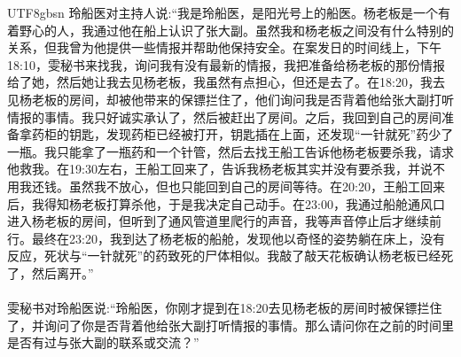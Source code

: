 \documentclass[11pt]{article}
\begin{document}
{\begin{CJK}{UTF8}{gbsn}
玲船医对主持人说:``我是玲船医，是阳光号上的船医。杨老板是一个有着野心的人，我通过他在船上认识了张大副。虽然我和杨老板之间没有什么特别的关系，但我曾为他提供一些情报并帮助他保持安全。在案发日的时间线上，下午18:10，雯秘书来找我，询问我有没有最新的情报，我把准备给杨老板的那份情报给了她，然后她让我去见杨老板，我虽然有点担心，但还是去了。在18:20，我去见杨老板的房间，却被他带来的保镖拦住了，他们询问我是否背着他给张大副打听情报的事情。我只好诚实承认了，然后被赶出了房间。之后，我回到自己的房间准备拿药柜的钥匙，发现药柜已经被打开，钥匙插在上面，还发现“一针就死”药少了一瓶。我只能拿了一瓶药和一个针管，然后去找王船工告诉他杨老板要杀我，请求他救我。在19:30左右，王船工回来了，告诉我杨老板其实并没有要杀我，并说不用我还钱。虽然我不放心，但也只能回到自己的房间等待。在20:20，王船工回来后，我得知杨老板打算杀他，于是我决定自己动手。在23:00，我通过船舱通风口进入杨老板的房间，但听到了通风管道里爬行的声音，我等声音停止后才继续前行。最终在23:20，我到达了杨老板的船舱，发现他以奇怪的姿势躺在床上，没有反应，死状与“一针就死”的药致死的尸体相似。我敲了敲天花板确认杨老板已经死了，然后离开。''\\ \\
雯秘书对玲船医说:``玲船医，你刚才提到在18:20去见杨老板的房间时被保镖拦住了，并询问了你是否背着他给张大副打听情报的事情。那么请问你在之前的时间里是否有过与张大副的联系或交流？''\\ \\

\end{CJK}}
\end{document}
